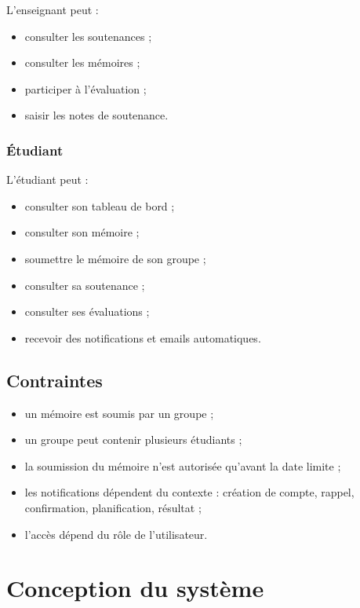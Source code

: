 \documentclass[a4paper,12pt,oneside]{report}
\begin{document}
L'enseignant peut :
\begin{itemize}
    \item consulter les soutenances ;
    \item consulter les mémoires ;
    \item participer à l'évaluation ;
    \item saisir les notes de soutenance.
\end{itemize}

\subsection{Étudiant}

L'étudiant peut :
\begin{itemize}
    \item consulter son tableau de bord ;
    \item consulter son mémoire ;
    \item soumettre le mémoire de son groupe ;
    \item consulter sa soutenance ;
    \item consulter ses évaluations ;
    \item recevoir des notifications et emails automatiques.
\end{itemize}

\section{Contraintes}

\begin{itemize}
    \item un mémoire est soumis par un groupe ;
    \item un groupe peut contenir plusieurs étudiants ;
    \item la soumission du mémoire n'est autorisée qu'avant la date limite ;
    \item les notifications dépendent du contexte : création de compte, rappel, confirmation, planification, résultat ;
    \item l'accès dépend du rôle de l'utilisateur.
\end{itemize}

\chapter{Conception du système}
\end{document}
